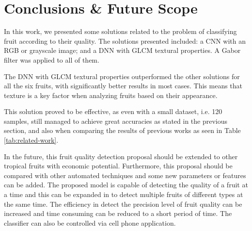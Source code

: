 \documentclass[../main.tex]{subfile}
\begin{document}
\section{Conclusions \& Future Scope} \label{sec:conclusions-&-future-scope}

In this work, we presented some solutions related to the problem of classifying fruit according to their quality. The solutions presented included: a CNN with an RGB or grayscale image; and a DNN with GLCM textural properties. A Gabor filter was applied to all of them.

The DNN with GLCM textural properties outperformed the other solutions for all the six fruits, with significantly better results in most cases. This means that texture is a key factor when analyzing fruits based on their appearance.



This solution proved to be effective, as even with a small dataset, i.e. 120 samples, still managed to achieve great accuracies as stated in the previous section, and also when comparing the results of previous works as seen in Table \ref{tab:related-work}.

In the future, this fruit quality detection proposal should be extended to other tropical fruits with economic potential. Furthermore, this proposal should be compared with other automated techniques and some new parameters or features can be added. The proposed model is capable of detecting the quality of a fruit at a time and this can be expanded in to detect multiple fruits of different types at the same time. The efficiency in detect the precision level of fruit quality can be increased and time consuming can be reduced to a short period of time. The classifier can also be controlled via cell phone application.
\end{document}
